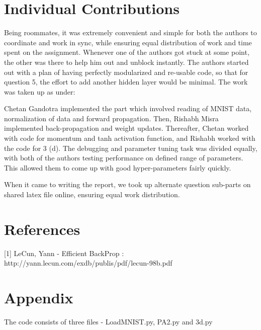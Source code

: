 \documentclass{article}
\begin{document}
\section{Individual Contributions}
Being roommates, it was extremely convenient and simple for both the authors to coordinate and work in sync, while ensuring equal distribution of work and time spent on the assignment. Whenever one of the authors got stuck at some point, the other was there to help him out and unblock instantly. The authors started out with a plan of having perfectly modularized and re-usable code, so that for question 5, the effort to add another hidden layer would be minimal. The work was taken up as under:

Chetan Gandotra implemented the part which involved reading of MNIST data, normalization of data and forward propagation. Then, Rishabh Misra implemented back-propagation and weight updates. Thereafter, Chetan worked with code for momentum and tanh activation function, and Rishabh worked with the code for 3 (d). The debugging and parameter tuning task was divided equally, with both of the authors testing performance on defined range of parameters. This allowed them to come up with good hyper-parameters fairly  quickly. 

When it came to writing the report, we took up alternate question sub-parts on shared latex file online, ensuring equal work distribution.

\newpage
\section*{References}
\small
[1] LeCun, Yann - Efficient BackProp : http://yann.lecun.com/exdb/publis/pdf/lecun-98b.pdf

\section*{Appendix}
The code consists of three files - LoadMNIST.py, PA2.py and 3d.py
\end{document}
